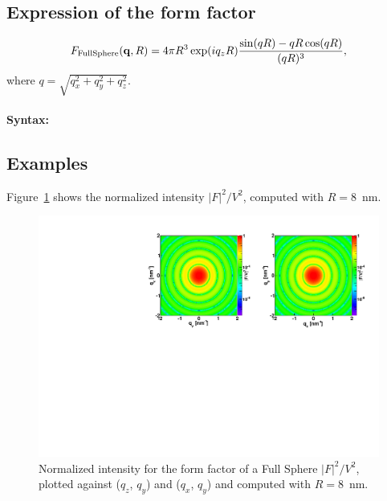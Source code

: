 \subsection{Expression of the form factor}
\begin{equation}
F_{\rm{FullSphere}}(\mathbf{q},R) = 4\pi R^3 \exp(iq_z R)\frac{\sin(q R) - q R \cos(q R)}{(qR)^3},
\end{equation}
where $q=\sqrt{q_x^2 + q_y^2 + q_z^2}$.

\paragraph{Syntax:} 

\newpage

\subsection{Examples}
Figure~\ref{fig:FFfSphereEx} shows the normalized intensity $|F|^2/V^2$, computed with $R=8$~nm.
\begin{figure}[h]
\begin{center}
\includegraphics[width=\textwidth]{Figures/figfffsphere}
\end{center}
\caption{Normalized intensity for the
  form factor of a Full Sphere
  $|F|^2/V^2$, plotted against ($q_z$, $q_y$) and ($q_x$, $q_y$) and computed with $R=8$~nm.}
\label{fig:FFfSphereEx}
\end{figure}

\FloatBarrier
\newpage{\cleardoublepage}

